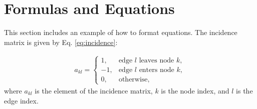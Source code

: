 \section{Formulas and Equations}

This section includes an example of how to format equations. The incidence matrix is given by Eq. \ref{eq:incidence}:

\begin{align}\label{eq:incidence}
    a_{kl}=
    \begin{cases}
        1,  & \text{edge $l$ leaves node $k$},\\
        -1, & \text{edge $l$ enters node $k$},\\
        0,  & \text{otherwise},
    \end{cases}
\end{align}
where $a_{kl}$ is the element of the incidence matrix, $k$ is the node index, and $l$ is the edge index.